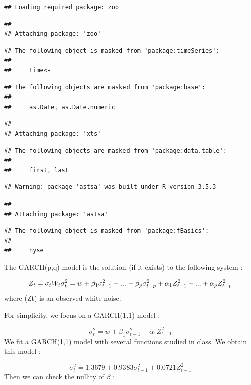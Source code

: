 \documentclass[]{article}
\begin{document}
\begin{verbatim}
## Loading required package: zoo
\end{verbatim}

\begin{verbatim}
## 
## Attaching package: 'zoo'
\end{verbatim}

\begin{verbatim}
## The following object is masked from 'package:timeSeries':
## 
##     time<-
\end{verbatim}

\begin{verbatim}
## The following objects are masked from 'package:base':
## 
##     as.Date, as.Date.numeric
\end{verbatim}

\begin{verbatim}
## 
## Attaching package: 'xts'
\end{verbatim}

\begin{verbatim}
## The following objects are masked from 'package:data.table':
## 
##     first, last
\end{verbatim}

\begin{verbatim}
## Warning: package 'astsa' was built under R version 3.5.3
\end{verbatim}

\begin{verbatim}
## 
## Attaching package: 'astsa'
\end{verbatim}

\begin{verbatim}
## The following object is masked from 'package:fBasics':
## 
##     nyse
\end{verbatim}

The GARCH(p,q) model is the solution (if it exists) to the following
system :

\[
Z_t=\sigma_t W_t \\
\sigma_t^2 = w +\beta_1 \sigma_{t-1}^2 + ... + \beta_p \sigma_{t-p}^2 + \alpha_1 Z_{t-1}^2 +...+ \alpha_p Z_{t-p}^2
\] where (Zt) is an observed white noise.

For simplicity, we focus on a GARCH(1,1) model :

\[
\sigma_t^2 = w +\beta_1 \sigma_{t-1}^2 + \alpha_1 Z_{t-1}^2
\] We fit a GARCH(1,1) model with several functions studied in class. We
obtain this model :

\[
\sigma_t^2 = 1.3679 +0.9383 \sigma_{t-1}^2 + 0.0721 Z_{t-1}^2
\] Then we can check the nullity of \(\beta\) :
\end{document}
